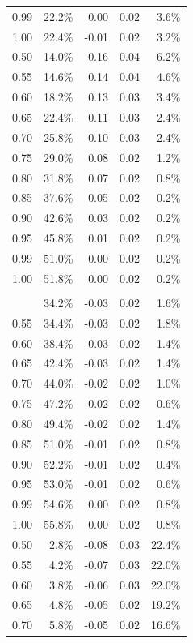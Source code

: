 \documentclass[
  letterpaper,
  DIV=11,
  numbers=noendperiod]{scrartcl}
\begin{document}
\begin{table}
{\begin{tabular*}{\linewidth}{@{\extracolsep{\fill}}rrrrr}
0.99 & 22.2\% & 0.00 & 0.02 & 3.6\% \\ 
1.00 & 22.4\% & -0.01 & 0.02 & 3.2\% \\ 
0.50 & 14.0\% & 0.16 & 0.04 & 6.2\% \\ 
0.55 & 14.6\% & 0.14 & 0.04 & 4.6\% \\ 
0.60 & 18.2\% & 0.13 & 0.03 & 3.4\% \\ 
0.65 & 22.4\% & 0.11 & 0.03 & 2.4\% \\ 
0.70 & 25.8\% & 0.10 & 0.03 & 2.4\% \\ 
0.75 & 29.0\% & 0.08 & 0.02 & 1.2\% \\ 
0.80 & 31.8\% & 0.07 & 0.02 & 0.8\% \\ 
0.85 & 37.6\% & 0.05 & 0.02 & 0.2\% \\ 
0.90 & 42.6\% & 0.03 & 0.02 & 0.2\% \\ 
0.95 & 45.8\% & 0.01 & 0.02 & 0.2\% \\ 
0.99 & 51.0\% & 0.00 & 0.02 & 0.2\% \\ 
1.00 & 51.8\% & 0.00 & 0.02 & 0.2\% \\ 
\midrule\addlinespace[2.5pt]
\multicolumn{5}{l}{D} \\[2.5pt] 
\midrule\addlinespace[2.5pt]
0.50 & 34.2\% & -0.03 & 0.02 & 1.6\% \\ 
0.55 & 34.4\% & -0.03 & 0.02 & 1.8\% \\ 
0.60 & 38.4\% & -0.03 & 0.02 & 1.4\% \\ 
0.65 & 42.4\% & -0.03 & 0.02 & 1.4\% \\ 
0.70 & 44.0\% & -0.02 & 0.02 & 1.0\% \\ 
0.75 & 47.2\% & -0.02 & 0.02 & 0.6\% \\ 
0.80 & 49.4\% & -0.02 & 0.02 & 1.4\% \\ 
0.85 & 51.0\% & -0.01 & 0.02 & 0.8\% \\ 
0.90 & 52.2\% & -0.01 & 0.02 & 0.4\% \\ 
0.95 & 53.0\% & -0.01 & 0.02 & 0.6\% \\ 
0.99 & 54.6\% & 0.00 & 0.02 & 0.8\% \\ 
1.00 & 55.8\% & 0.00 & 0.02 & 0.8\% \\ 
0.50 & 2.8\% & -0.08 & 0.03 & 22.4\% \\ 
0.55 & 4.2\% & -0.07 & 0.03 & 22.0\% \\ 
0.60 & 3.8\% & -0.06 & 0.03 & 22.0\% \\ 
0.65 & 4.8\% & -0.05 & 0.02 & 19.2\% \\ 
0.70 & 5.8\% & -0.05 & 0.02 & 16.6\% \\ 

\end{tabular*}}
\end{table}
\end{document}
